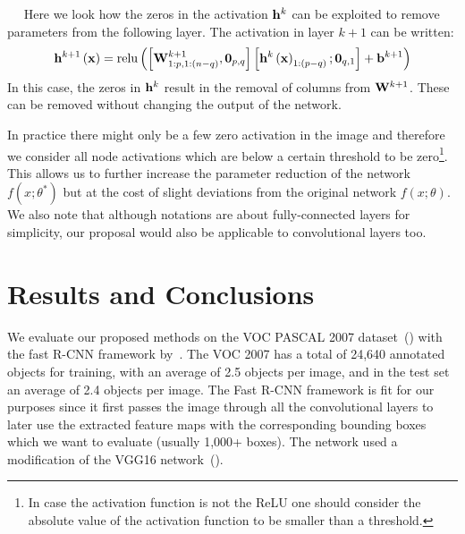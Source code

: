 \documentclass{article}
\newcommand{\minisection}[1]{\vspace{0.04in} \noindent {\bf #1}\ \ }
\begin{document}
\minisection{Forward unit pruning:} Here we look how the zeros in the
activation ${\bf{h}}^k$ can be exploited to remove parameters from the
following layer. The activation in layer $k+1$ can be written:
\begin{equation}{\bf{h}}^{k + 1} \left( {\bf{x}} \right) = \mathrm{relu}\left( {\left[ {{\bf{W}}^{k + 1} _{1:p,1:\left( {n - q} \right)} ,{\bf{0}}_{p,q} } \right]\left[ {{\bf{h}}^k \left( {\bf{x}} \right)_{1:\left( {p - q} \right)} ;{\bf{0}}_{q,1} } \right] + {\bf{b}}^{k + 1} } \right)
\end{equation}
In this case, the zeros in ${\bf{h}}^k$ result in the removal of
columns from ${\bf{W}}^{k + 1}$. These can be removed without changing
the output of the network.

In practice there might only be a few zero activation in the image
 and therefore we consider all node activations which are below a certain threshold to be zero\footnote{In case the activation function is not the ReLU one should consider the absolute value of
  the activation function to be smaller than a threshold.}. This
allows us to further increase the parameter reduction of the network $f\left( {x;\theta ^* } \right)$
 but at the cost of slight deviations from the original
network $f\left( {x;\theta } \right)$. We also note that although notations are about fully-connected layers for simplicity, our proposal would also be applicable to convolutional layers too.
\section{Results and Conclusions}
We evaluate our proposed methods on the VOC PASCAL 2007
dataset~(\cite{everingham2010pascal}) with the fast R-CNN
framework by~\cite{girshick2015fast}. The VOC 2007 has a total of 24,640
annotated objects for training, with an average of 2.5 objects per
image, and in the test set an average of 2.4 objects per image. The
Fast R-CNN framework is fit for our purposes since it first passes the
image through all the convolutional layers to later use the extracted
feature maps with the corresponding bounding boxes which we want to
evaluate (usually 1,000+ boxes). The network used a modification of
the VGG16 network~(\cite{simonyan2014very}).
\end{document}
